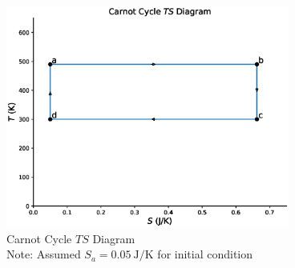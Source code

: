 \documentclass[12pt]{iopart} %
\gdef\units#1{~\mathrm{#1}}
\begin{document}
\begin{figure}[htbp]
  \begin{indented}
  \item[]\includegraphics[width=0.83\textwidth]{ts-diagram-carnot-cycle.eps}
  \end{indented}
  \caption{\label{fig:ts_diagram}
  Carnot Cycle $TS$ Diagram \\
  Note: Assumed $S_a = 0.05 \units{J/K}$ for initial condition
  }
\end{figure}
\end{document}
